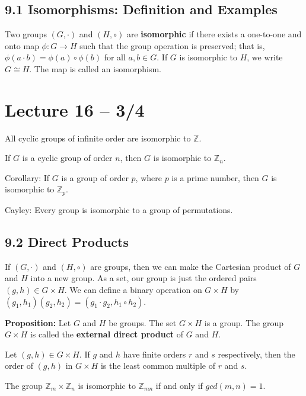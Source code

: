\documentclass{article}
\newcommand{\Z}{\mathbb{Z}}
\begin{document}
\subsection{9.1 Isomorphisms: Definition and Examples}
Two groups $(G,\cdot)$ and $(H,\circ)$ are \textbf{isomorphic} if there exists a one-to-one and onto map $\phi:G\to H$ such that the group operation is preserved; that is, $\phi(a\cdot b)=\phi(a)\circ\phi(b)$ for all $a,b\in G$. If $G$ is isomorphic to $H$, we write $G\cong H$. The map is called an isomorphism.
\section{Lecture 16 -- 3/4}
\begin{theorem}
  All cyclic groups of infinite order are isomorphic to $\Z$.
\end{theorem}
\begin{theorem}
  If $G$ is a cyclic group of order $n$, then $G$ is isomorphic to $\Z_n$.

  Corollary: If $G$ is a group of order $p$, where $p$ is a prime number, then $G$ is isomorphic to $\Z_p$.
\end{theorem}
\begin{theorem}
  Cayley: Every group is isomorphic to a group of permutations.
\end{theorem}
\subsection{9.2 Direct Products}
If $(G,\cdot)$ and $(H,\circ)$ are groups, then we can make the Cartesian product of $G$ and $H$ into a new group. As a set, our group is just the ordered pairs $(g,h)\in G\times H$. We can define a binary operation on $G\times H$ by $(g_1,h_1)(g_2,h_2)=(g_1\cdot g_2, h_1\circ h_2)$.

\textbf{Proposition:} Let $G$ and $H$ be groups. The set $G\times H$ is a group. The group $G\times H$ is called the \textbf{external direct product} of $G$ and $H$.

\begin{theorem}
  Let $(g,h)\in G\times H$. If $g$ and $h$ have finite orders $r$ and $s$ respectively, then the order of $(g,h)$ in $G\times H$ is the least common multiple of $r$ and $s$.
\end{theorem}
\begin{theorem}
  The group $\Z_m\times\Z_n$ is isomorphic to $\Z_{mn}$ if and only if $gcd(m,n)=1$.
\end{theorem}
\end{document}
